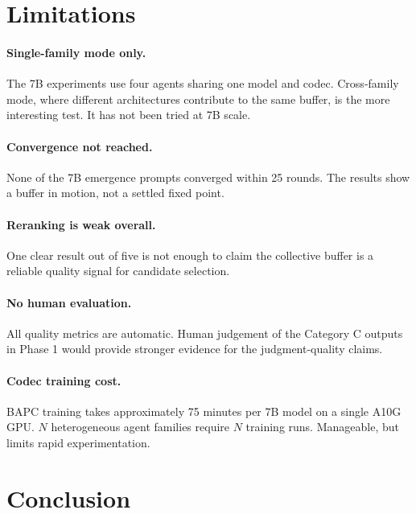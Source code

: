\documentclass[10pt,twocolumn]{article}
\begin{document}
\section{Limitations}

\paragraph{Single-family mode only.}
The 7B experiments use four agents sharing one model and codec. Cross-family mode, where different architectures contribute to the same buffer, is the more interesting test. It has not been tried at 7B scale.

\paragraph{Convergence not reached.}
None of the 7B emergence prompts converged within 25 rounds. The results show a buffer in motion, not a settled fixed point.

\paragraph{Reranking is weak overall.}
One clear result out of five is not enough to claim the collective buffer is a reliable quality signal for candidate selection.

\paragraph{No human evaluation.}
All quality metrics are automatic. Human judgement of the Category C outputs in Phase 1 would provide stronger evidence for the judgment-quality claims.

\paragraph{Codec training cost.}
BAPC training takes approximately 75 minutes per 7B model on a single A10G GPU. $N$ heterogeneous agent families require $N$ training runs. Manageable, but limits rapid experimentation.

\section{Conclusion}
\end{document}
